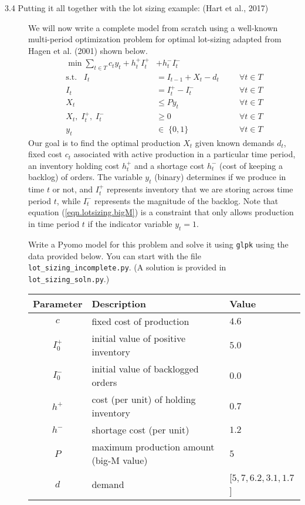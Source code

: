 \documentclass[12pt]{article}
\begin{document}
\begin{description}
\item [3.4 Putting it all together with the lot sizing example: (Hart et al., 2017)] We will now write a complete model from scratch using a
  well-known multi-period optimization problem for optimal lot-sizing adapted from Hagen et al. (2001) shown below.
\begin{align}
  \min \sum_{t \in T} c_t y_t + h^{+}_t I^{+}_t &+ h^{-}_t I^{-}_t && \\
  \mbox{s.t.} \;\;\; I_t &= I_{t-1} + X_t - d_t \;\;\; &&\forall t \in T \\
  I_t &= I^{+}_t - I^{-}_t && \forall t \in T\\
  X_t &\le P y_t \;\;\; &&\forall t \in T \label{eqn.lotsizing.bigM} \\
  X_t,\; I^{+}_t,\;I^{-}_t &\ge 0 \;\;\; &&\forall t \in T \\
  y_t \; &\in \; \{0,1\} \;\;\; &&\forall t \in T
\end{align}
Our goal is to find the optimal production $X_t$ given known demands $d_t$, fixed cost $c_t$
associated with active production in a particular time period, an inventory
holding cost $h_t^{+}$ and a shortage cost $h^{-}_t$ (cost of keeping a backlog) of orders.
The variable $y_t$ (binary) determines if we produce in time $t$ or not, and 
$I^{+}_t$ represents inventory that we are storing across time period $t$, while $I^{-}_t$ represents
the magnitude of the backlog.
Note that equation (\ref{eqn.lotsizing.bigM}) is a constraint that only allows production in time period $t$ if the indicator variable $y_t{=}1$.

Write a Pyomo model for this problem and solve it using {\tt glpk} using the data provided below. You can start with the file {\tt lot\_sizing\_incomplete.py}. (A solution is provided in {\tt lot\_sizing\_soln.py}.) \\

\begin{tabular}{cp{3in}l}
    Parameter & Description & Value \\
    \hline \hline
    $c$ & fixed cost of production & $4.6$ \\
    $I^{+}_0$ & initial value of positive inventory & $5.0$ \\
    $I^{-}_0$ & initial value of backlogged orders & $0.0$ \\
    $h^{+}$ & cost (per unit) of holding inventory & $0.7$ \\
    $h^{-}$ & shortage cost (per unit) & $1.2$ \\
    $P$ & maximum production amount (big-M value) & $5$ \\
    $d$ & demand & [$5, 7, 6.2, 3.1, 1.7$] \\
    \hline
\end{tabular}

\end{description}
\end{document}
